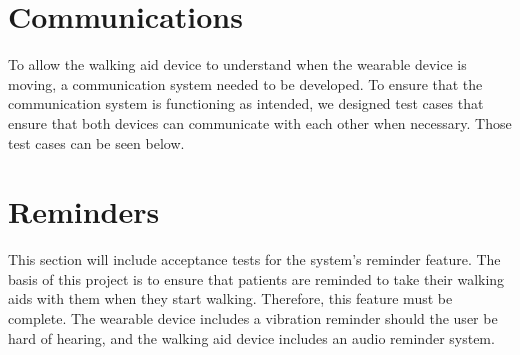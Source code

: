         \vspace{4em}
        

        \vspace{4em}
        

    \section{Communications}
    \label{sec:test_comms}

        To allow the walking aid device to understand when the wearable device is moving, a communication system needed to be developed. To ensure that the communication system is functioning as intended, we designed test cases that ensure that both devices can communicate with each other when necessary. Those test cases can be seen below.

        \vspace{1em}
        

        \vspace{4em}
        

        \vspace{4em}
        

        \vspace{4em}
        

    \section{Reminders}
    \label{sec:test_reminders}

        This section will include acceptance tests for the system's reminder feature. The basis of this project is to ensure that patients are reminded to take their walking aids with them when they start walking. Therefore, this feature must be complete. The wearable device includes a vibration reminder should the user be hard of hearing, and the walking aid device includes an audio reminder system.

        \vspace{1em}
        

        \vspace{4em}
        

